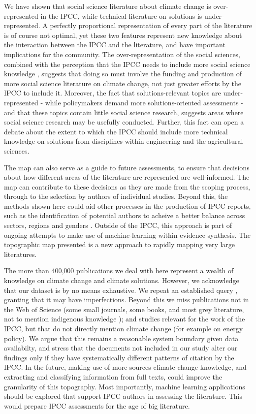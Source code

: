 \documentclass{article}
\begin{document}
\begin{linenumbers}
		
		We have shown that social science literature about climate change is over-represented in the IPCC, while technical literature on solutions is under-represented.
		A perfectly proportional representation of every part of the literature is of course not optimal, yet these two features represent new knowledge about the interaction between the IPCC and the literature, and have important implications for the community. 
		The over-representation of the social sciences, combined with the perception that the IPCC needs to include more social science knowledge \cite{Victor2015}, suggests that doing so must involve the funding and production of more social science literature on climate change, not just greater efforts by the IPCC to include it. 
		Moreover, the fact that solutions-relevant topics are under-represented - while policymakers demand more solutions-oriented assessments - and that these topics contain little social science research, suggests areas where social science research may be usefully conducted. Further, this fact can open a debate about the extent to which the IPCC should include more technical knowledge on solutions from disciplines within engineering and the agricultural sciences.
		
		
		The map can also serve as a guide to future assessments, to ensure that decisions about how different areas of the literature are represented are well-informed. 
		The map can contribute to these decisions as they are made from the scoping process, through to the selection by authors of individual studies.
		Beyond this, the methods shown here could aid other processes in the production of IPCC reports, such as the identification of potential authors to acheive a better balance across sectors, regions and genders \cite{Corbera2016}.
		Outside of the IPCC, this approach is part of ongoing attempts to make use of machine-learning within evidence synthesis. The topographic map presented is a new approach to rapidly mapping very large literatures. 
		
		The more than 400,000 publications we deal with here represent a wealth of knowledge on climate change and climate solutions. However, we acknowledge that our dataset is by no means exhaustive. We repeat an established query \cite{Haunschild2016}, granting that it may have imperfections. Beyond this we miss publications not in the Web of Science (some small journals, some books, and most grey literature, not to mention indigenous knowledge \cite{Ford2016b}); and studies relevant for the work of the IPCC, but that do not directly mention climate change (for example on energy policy). We argue that this remains a reasonable system boundary given data availabilty, and stress that the documents not included in our study alter our findings only if they have systematically different patterns of citation by the IPCC. In the future, making use of more sources climate change knowledge, and extracting and classifying information from full texts, could improve the granularity of this topography. Most importantly, machine learning applications should be explored that support IPCC authors in assessing the literature. This would prepare IPCC assessments for the age of big literature.
		

\end{linenumbers}
\end{document}
